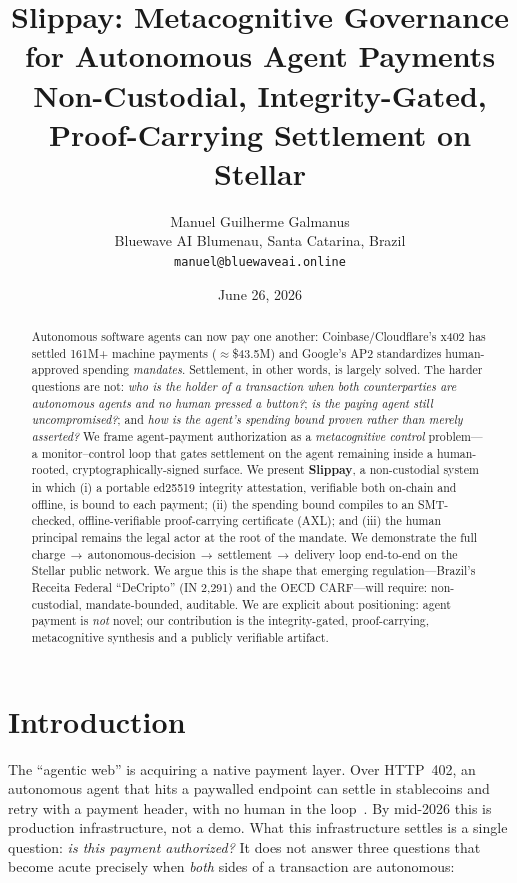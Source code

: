 \documentclass[11pt]{article}
\title{\textbf{Slippay: Metacognitive Governance for Autonomous Agent Payments}\\[2pt]
\large Non-Custodial, Integrity-Gated, Proof-Carrying Settlement on Stellar}
\author{
  Manuel Guilherme Galmanus\\
  \small Bluewave AI \;\textbar\; Blumenau, Santa Catarina, Brazil\\
  \small \texttt{manuel@bluewaveai.online}
}
\date{June 26, 2026}
\begin{document}
\maketitle
\thispagestyle{fancy}

\begin{abstract}
Autonomous software agents can now pay one another: Coinbase/Cloudflare's x402 has settled
161M+ machine payments ($\approx$\$43.5M) and Google's AP2 standardizes human-approved
spending \emph{mandates}. Settlement, in other words, is largely solved. The harder questions
are not: \emph{who is the holder of a transaction when both counterparties are autonomous agents
and no human pressed a button?}; \emph{is the paying agent still uncompromised?}; and \emph{how
is the agent's spending bound proven rather than merely asserted?} We frame agent-payment
authorization as a \emph{metacognitive control} problem---a monitor--control loop that gates
settlement on the agent remaining inside a human-rooted, cryptographically-signed surface. We
present \textbf{Slippay}, a non-custodial system in which (i) a portable \mbox{ed25519} integrity
attestation, verifiable both on-chain and offline, is bound to each payment; (ii) the spending
bound compiles to an SMT-checked, offline-verifiable proof-carrying certificate (AXL); and (iii)
the human principal remains the legal actor at the root of the mandate. We demonstrate the full
charge\,$\rightarrow$\,autonomous-decision\,$\rightarrow$\,settlement\,$\rightarrow$\,delivery
loop end-to-end on the Stellar public network. We argue this is the shape that emerging
regulation---Brazil's Receita Federal ``DeCripto'' (IN 2{,}291) and the OECD CARF---will
require: non-custodial, mandate-bounded, auditable. We are explicit about positioning: agent
payment is \emph{not} novel; our contribution is the integrity-gated, proof-carrying,
metacognitive synthesis and a publicly verifiable artifact.
\end{abstract}

\section{Introduction}

The ``agentic web'' is acquiring a native payment layer. Over HTTP~402, an autonomous agent that
hits a paywalled endpoint can settle in stablecoins and retry with a payment header, with no
human in the loop~\citep{x402coinbase,rohitraj,turnkey}. By mid-2026 this is production
infrastructure, not a demo. What this infrastructure settles is a single question: \emph{is this
payment authorized?} It does not answer three questions that become acute precisely when
\emph{both} sides of a transaction are autonomous:
\end{document}
